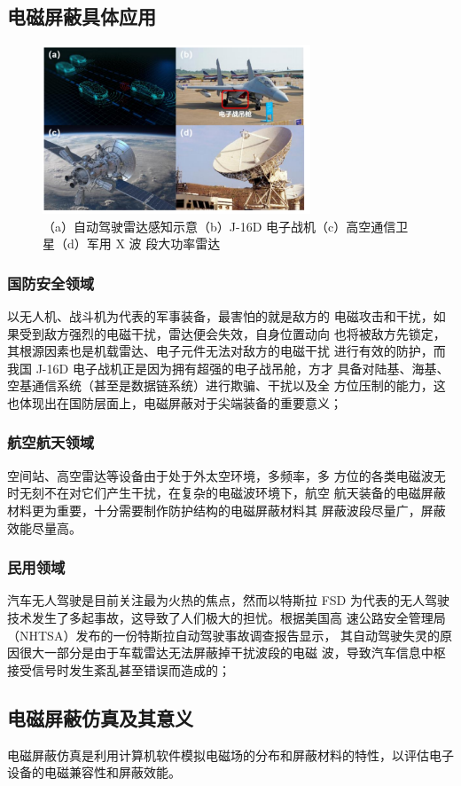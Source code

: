\documentclass{article}
\begin{document}
\subsection{电磁屏蔽具体应用}
        \begin{figure}[H]
            \centering
            \includegraphics[width=8cm]{img/1.png}
            \caption{（a）自动驾驶雷达感知示意（b）J-16D 电子战机（c）高空通信卫星（d）军用 X 波
            段大功率雷达}
            \end{figure}
\subsubsection{国防安全领域}
以无人机、战斗机为代表的军事装备，最害怕的就是敌方的
电磁攻击和干扰，如果受到敌方强烈的电磁干扰，雷达便会失效，自身位置动向
也将被敌方先锁定，其根源因素也是机载雷达、电子元件无法对敌方的电磁干扰
进行有效的防护，而我国 J-16D 电子战机正是因为拥有超强的电子战吊舱，方才
具备对陆基、海基、空基通信系统（甚至是数据链系统）进行欺骗、干扰以及全
方位压制的能力，这也体现出在国防层面上，电磁屏蔽对于尖端装备的重要意义；

\subsubsection{航空航天领域}
空间站、高空雷达等设备由于处于外太空环境，多频率，多
方位的各类电磁波无时无刻不在对它们产生干扰，在复杂的电磁波环境下，航空
航天装备的电磁屏蔽材料更为重要，十分需要制作防护结构的电磁屏蔽材料其
屏蔽波段尽量广，屏蔽效能尽量高。
\subsubsection{民用领域}
汽车无人驾驶是目前关注最为火热的焦点，然而以特斯拉 FSD
为代表的无人驾驶技术发生了多起事故，这导致了人们极大的担忧。根据美国高
速公路安全管理局（NHTSA）发布的一份特斯拉自动驾驶事故调查报告显示，
其自动驾驶失灵的原因很大一部分是由于车载雷达无法屏蔽掉干扰波段的电磁
波，导致汽车信息中枢接受信号时发生紊乱甚至错误而造成的；
\subsection{电磁屏蔽仿真及其意义}
电磁屏蔽仿真是利用计算机软件模拟电磁场的分布和屏蔽材料的特性，以评估电子设备的电磁兼容性和屏蔽效能。
\end{document}
